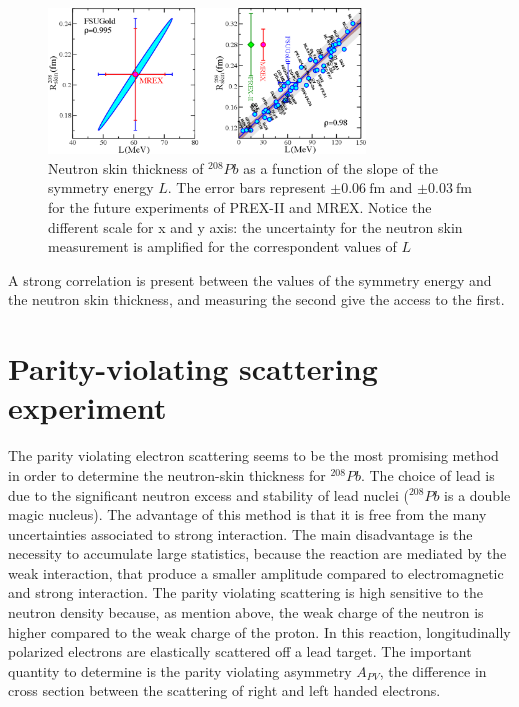 \begin{figure}[hbtp]
 \centering
 \includegraphics[width=0.75\textwidth]{Introduzione/LvsR.pdf}
 \caption{Neutron skin thickness of $^{208}Pb$ as a function of the slope of the symmetry energy $L$. The error bars represent $\pm \SI{0.06}{\femto \meter}$ and $\pm \SI{0.03}{\femto \meter}$ for the future experiments of PREX-II and MREX. Notice the different scale for x and y axis: the uncertainty for the neutron skin measurement is amplified for the correspondent values of $L$ }
 \label{fig:LvsR}
 \end{figure}
 
A strong correlation is present between the values of the symmetry energy and the neutron skin thickness, and measuring the second give the access to the first. 

\section{Parity-violating scattering experiment}

The parity violating electron scattering seems to be the most promising method in order to determine the neutron-skin thickness for $^{208}Pb$. The choice of lead is due to the significant neutron excess and stability of lead nuclei ($^{208}Pb$ is a double magic nucleus). The advantage of this method is that it is free from the many uncertainties associated to strong interaction. The main disadvantage is the necessity to accumulate large statistics, because the reaction are mediated by the weak interaction, that produce a smaller amplitude compared to electromagnetic and strong interaction. 
The parity violating scattering is high sensitive to the neutron density because, as mention above, the weak charge of the neutron is higher compared to the weak charge of the proton.
In this reaction, longitudinally polarized electrons are elastically scattered off a lead target. The important quantity to determine is the parity violating asymmetry $A_{PV}$, the difference in cross section between the scattering of right and left handed electrons. 

